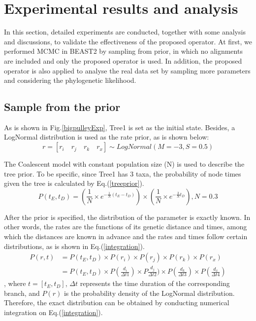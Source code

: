 \documentclass{bmcart}
\begin{document}
\section*{Experimental results and analysis}
In this section, detailed experiments are conducted, together with some analysis and discussions, to validate the effectiveness of the proposed operator. At first, we performed MCMC in BEAST2 by sampling from prior, in which no alignments are included and only the proposed operator is used. In addition, the proposed operator is also applied to analyse the real data set by sampling more parameters and considering the phylogenetic likelihood.
\subsection*{Sample from the prior}
As is shown in Fig.\ref{bigpulleyExp},  Tree1 is set as the initial state. Besides, a LogNormal distribution is used as the rate prior, as is shown below:
\begin{equation}
r = [{r_i}\quad{r_j}\quad{r_k}\quad{r_x}] \sim LogNormal(M = -3, S = 0.5)
\end{equation}

The Coalescent model with constant population size (N) is used to describe the tree prior. To be specific, since Tree1 has 3 taxa, the probability of node times given the tree is calculated by Eq.(\ref{treeprior}).
\begin{equation}
\label{treeprior}
P({t_E},{t_D}) = (\frac{1}{N} \times {e^{ - \frac{1}{N}({t_E} - {t_D})}}) \times (\frac{1}{N} \times {e^{ - \frac{3}{N}{t_D}}}), N = 0.3
\end{equation}

After the prior is specified, the distribution of the parameter is exactly known.  In other words, the rates are the functions of its genetic distance and times, among which the distances are known in advance and the rates and times follow certain distributions, as is shown in Eq.(\ref{integration}).
\begin{equation}\label{integration}
\begin{aligned}
P(r,t) &= P({t_E},{t_D}) \times P({r_i}) \times P({r_j}) \times P({r_k}) \times P({r_x}) \\&= P({t_E},{t_D}) \times P(\frac{{{d_i}}}{{\Delta t1}}) \times P\frac{{{d_j}}}{{\Delta t2}}) \times P(\frac{{{d_k}}}{{\Delta t3}}) \times P(\frac{{{d_x}}}{{\Delta t4}})
\end{aligned}
\end{equation}
, where $t = [{t_E},{t_D}]$, ${\Delta t}$ represents the time duration of the corresponding branch, and $P({r})$ is the probability density of the LogNormal distribution. Therefore, the exact distribution can be obtained by conducting numerical integration on Eq.(\ref{integration}).
\end{document}
